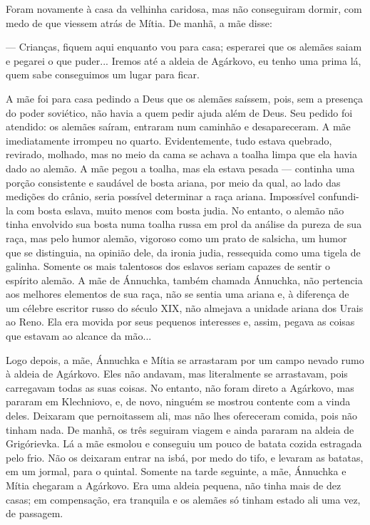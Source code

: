 Foram novamente à casa da velhinha caridosa, mas não conseguiram dormir,
com medo de que viessem atrás de Mítia. De manhã, a mãe disse:

--- Crianças, fiquem aqui enquanto vou para casa; esperarei que os
alemães saiam e pegarei o que puder... Iremos até a aldeia de Agárkovo,
eu tenho uma prima lá, quem sabe conseguimos um lugar para ficar.

A mãe foi para casa pedindo a Deus que os alemães saíssem, pois, sem a
presença do poder soviético, não havia a quem pedir ajuda além de Deus.
Seu pedido foi atendido: os alemães saíram, entraram num caminhão e
desapareceram. A mãe imediatamente irrompeu no quarto. Evidentemente,
tudo estava quebrado, revirado, molhado, mas no meio da cama se achava a
toalha limpa que ela havia dado ao alemão. A mãe pegou a toalha, mas ela
estava pesada --- continha uma porção consistente e saudável de bosta
ariana, por meio da qual, ao lado das medições do crânio, seria possível
determinar a raça ariana. Impossível confundi-la com bosta eslava, muito
menos com bosta judia. No entanto, o alemão não tinha envolvido sua
bosta numa toalha russa em prol da análise da pureza de sua raça, mas
pelo humor alemão, vigoroso como um prato de salsicha, um humor que se
distinguia, na opinião dele, da ironia judia, ressequida como uma tigela
de galinha. Somente os mais talentosos dos eslavos seriam capazes de
sentir o espírito alemão. A mãe de Ánnuchka, também chamada Ánnuchka,
não pertencia aos melhores elementos de sua raça, não se sentia uma
ariana e, à diferença de um célebre escritor russo do século XIX, não
almejava a unidade ariana dos Urais ao Reno. Ela era movida por seus
pequenos interesses e, assim, pegava as coisas que estavam ao alcance da
mão...

Logo depois, a mãe, Ánnuchka e Mítia se arrastaram por um campo nevado
rumo à aldeia de Agárkovo. Eles não andavam, mas literalmente se
arrastavam, pois carregavam todas as suas coisas. No entanto, não foram
direto a Agárkovo, mas pararam em Klechniovo, e, de novo, ninguém se
mostrou contente com a vinda deles. Deixaram que pernoitassem ali, mas
não lhes ofereceram comida, pois não tinham nada. De manhã, os três
seguiram viagem e ainda pararam na aldeia de Grigórievka. Lá a mãe
esmolou e conseguiu um pouco de batata cozida estragada pelo frio. Não
os deixaram entrar na isbá, por medo do tifo, e levaram as batatas, em
um jormal, para o quintal. Somente na tarde seguinte, a mãe, Ánnuchka e
Mítia chegaram a Agárkovo. Era uma aldeia pequena, não tinha mais de dez
casas; em compensação, era tranquila e os alemães só tinham estado ali
uma vez, de passagem.

